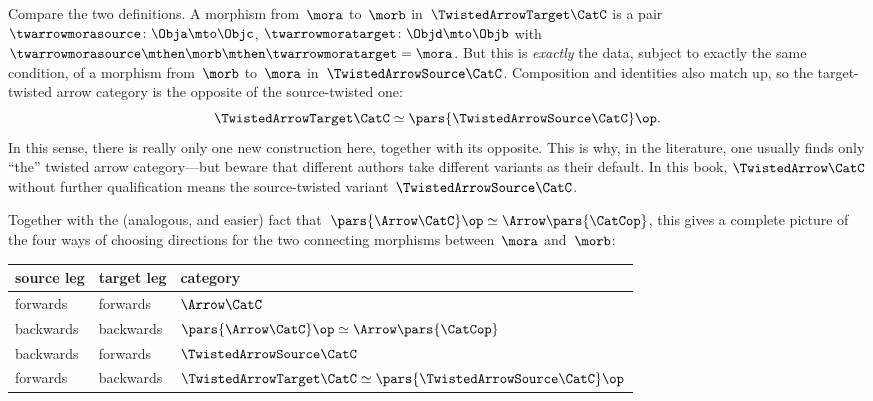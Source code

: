 \begin{remark}
    \label{rem:source-target-twisted}
    Compare the two definitions.
    A morphism from~$\mora$ to~$\morb$ in~$\TwistedArrowTarget\CatC$ is a pair~$\twarrowmorasource \colon \Obja \mto \Objc$, $\twarrowmoratarget \colon \Objd \mto \Objb$ with~$\twarrowmorasource \mthen \morb \mthen \twarrowmoratarget = \mora$.
    But this is \emph{exactly} the data, subject to exactly the same condition, of a morphism from~$\morb$ to~$\mora$ in~$\TwistedArrowSource\CatC$.
    Composition and identities also match up, so the target-twisted arrow category is the opposite of the source-twisted one:
    \begin{equation}
        \TwistedArrowTarget\CatC \simeq \pars{\TwistedArrowSource\CatC}\op.
    \end{equation}
    In this sense, there is really only one new construction here, together with its opposite.
    This is why, in the literature, one usually finds only ``the'' twisted arrow category---but beware that different authors take different variants as their default.
    In this book, $\TwistedArrow\CatC$ without further qualification means the source-twisted variant~$\TwistedArrowSource\CatC$.

    Together with the (analogous, and easier) fact that~$\pars{\Arrow\CatC}\op \simeq \Arrow\pars{\CatCop}$, this gives a complete picture of the four ways of choosing directions for the two connecting morphisms between~$\mora$ and~$\morb$:
    \begin{center}
        \begin{tabular}{lll}
            source leg & target leg & category \\
            \hline
            forwards   & forwards   & $\Arrow\CatC$ \\
            backwards  & backwards  & $\pars{\Arrow\CatC}\op \simeq \Arrow\pars{\CatCop}$ \\
            backwards  & forwards   & $\TwistedArrowSource\CatC$ \\
            forwards   & backwards  & $\TwistedArrowTarget\CatC \simeq \pars{\TwistedArrowSource\CatC}\op$
        \end{tabular}
    \end{center}
\end{remark}

